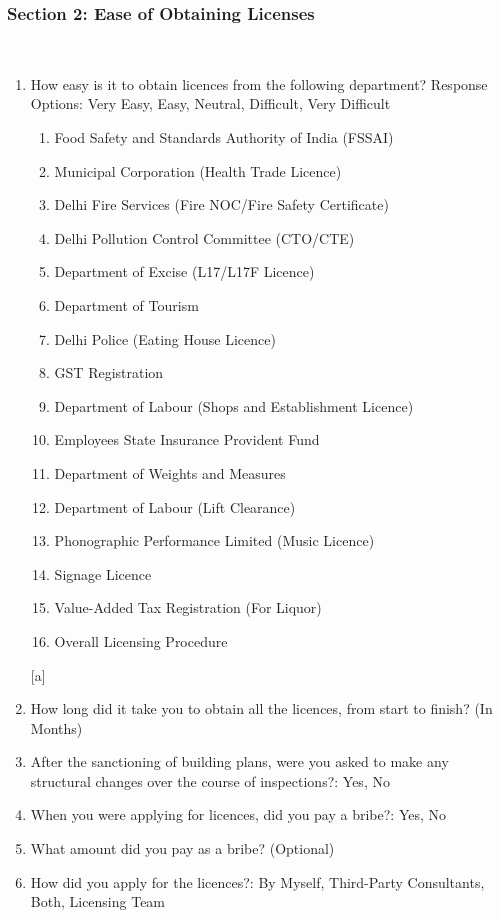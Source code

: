 \documentclass[a4paper, 12pt]{article}
\begin{document}
\begin {enumerate}
	\subsubsection {Section 2: Ease of Obtaining Licenses}\\
		\begin {enumerate}
		\item How easy is it to obtain licences from the following department? Response Options: Very Easy, Easy, Neutral, Difficult, Very Difficult\\
			\begin {enumerate}[a]
			\item Food Safety and Standards Authority of India (FSSAI)
			\item Municipal Corporation (Health Trade Licence)
			\item Delhi Fire Services (Fire NOC/Fire Safety Certificate)
			\item Delhi Pollution Control Committee (CTO/CTE)
			\item Department of Excise (L17/L17F Licence)
			\item Department of Tourism
			\item Delhi Police (Eating House Licence)
			\item GST Registration
			\item Department of Labour (Shops and Establishment Licence)
			\item Employees State Insurance Provident Fund
			\item Department of Weights and Measures
			\item Department of Labour (Lift Clearance)
			\item Phonographic Performance Limited (Music Licence)
			\item Signage Licence
			\item Value-Added Tax Registration (For Liquor)
			\item Overall Licensing Procedure
			\end {enumerate}[a]\\
		\item How long did it take you to obtain all the licences, from start to finish? (In Months)
		\item After the sanctioning of building plans, were you asked to make any structural changes over the course of inspections?: Yes, No
		\item When you were applying for licences, did you pay a bribe?: Yes, No
		\item What amount did you pay as a bribe? (Optional)
		\item How did you apply for the licences?: By Myself, Third-Party Consultants, Both, Licensing Team
		\end {enumerate}


\end{enumerate}
\end{document}
